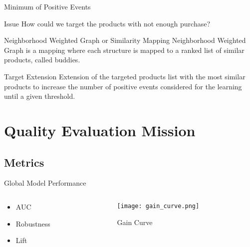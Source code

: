 \documentclass[pdf]{beamer}
\begin{document}
\begin{frame}{Minimum of Positive Events}
\begin{alertblock}{Issue}
How could we target the products with not enough purchase?
\end{alertblock}
\begin{block}{Neighborhood Weighted Graph or Similarity Mapping}
Neighborhood Weighted Graph is a mapping where each structure is mapped to a ranked list of similar products, called buddies. 
\end{block}

\begin{block}{Target Extension}
Extension of the targeted products list with the most similar products to increase the number of positive events considered for the learning until a given threshold.
\end{block}
 
\end{frame}


\section{Quality Evaluation Mission}
\subsection{Metrics}

\begin{frame}{Global Model Performance}
 \begin{columns}[T] %
     \begin{column}[T]{4cm} %
\begin{itemize}
	\item{AUC}
	\item{Robustness}
	\item{Lift}
\end{itemize}
    	\end{column}
    	     \begin{column}[T]{4cm} %
			\begin{figure}
	    	     \texttt{[image: gain\_curve.png]}
    	     \caption{Gain Curve}		
			\end{figure}			    	     
    	\end{column}
     \end{columns}
\end{frame}
\end{document}
